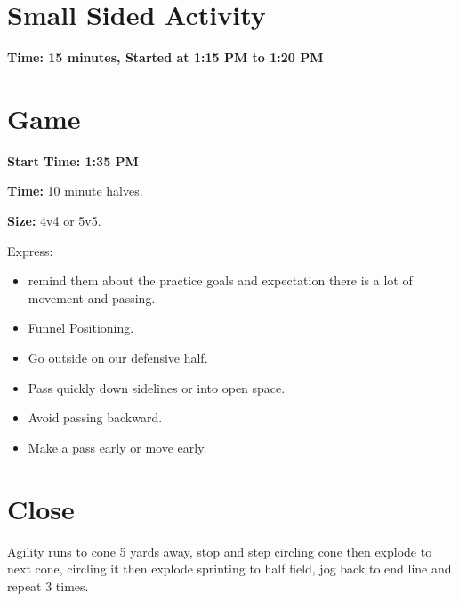 \documentclass[10pt,letterpaper]{article}
\newenvironment{oddBlock}[1]{%
    \tcolorbox[beamer,%
    noparskip,breakable,
    colback=LightBlue,colframe=DarkBlue,%
    colbacklower=DarkBlue!75!LightBlue,%
    title=#1]}%
    {\endtcolorbox}
\begin{document}
\clearpage

\section{Small Sided Activity}
\textbf{Time: 15 minutes, Started at 1:15 PM to 1:20 PM}


\section{Game}

\textbf{Start Time: 1:35 PM}

\begin{oddBlock}{Small Sided}
    \textbf{Time:} 10 minute halves.

    \textbf{Size:} 4v4 or 5v5.

    Express:
    \begin{itemize}
        \setlength{\itemsep}{0pt}
        \setlength{\parskip}{0pt}
        \setlength{\parsep}{0pt}
        \item  remind them about the practice goals and expectation there is a lot of movement and passing.
        \item Funnel Positioning.
        \item Go outside on our defensive half.
        \item Pass quickly down sidelines or into open space.
        \item Avoid passing backward.
        \item Make a pass early or move early.
    \end{itemize}

\end{oddBlock}

\section{Close}
\begin{oddBlock}{Sprints (5 min)}
    Agility runs to cone 5 yards away, stop and step circling cone then explode to next cone, circling it then explode sprinting to half field, jog back to end line and repeat 3 times.
\end{oddBlock}
\end{document}
